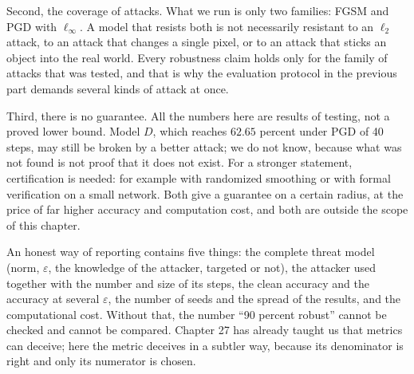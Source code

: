 Second, the coverage of attacks. What we run is only two families: FGSM and PGD with
$\ell_\infty$. A model that resists both is not necessarily resistant to an
$\ell_2$ attack, to an attack that changes a single pixel, or to an attack that sticks
an object into the real world. Every robustness claim holds only for the family of
attacks that was tested, and that is why the evaluation protocol in the previous part
demands several kinds of attack at once.

Third, there is no guarantee. All the numbers here are results of testing, not a
proved lower bound. Model $D$, which reaches $62.65$ percent under PGD of 40 steps,
may still be broken by a better attack; we do not know, because what was not found is
not proof that it does not exist. For a stronger statement, certification is needed:
for example with randomized smoothing or with formal verification on a small network.
Both give a guarantee on a certain radius, at the price of far higher accuracy and
computation cost, and both are outside the scope of this chapter.

An honest way of reporting contains five things: the complete threat model (norm,
$\varepsilon$, the knowledge of the attacker, targeted or not), the attacker used
together with the number and size of its steps, the clean accuracy and the accuracy at
several $\varepsilon$, the number of seeds and the spread of the results, and the
computational cost. Without that, the number ``90 percent robust'' cannot be checked
and cannot be compared. Chapter 27 has already taught us that metrics can deceive;
here the metric deceives in a subtler way, because its denominator is right and only
its numerator is chosen.

